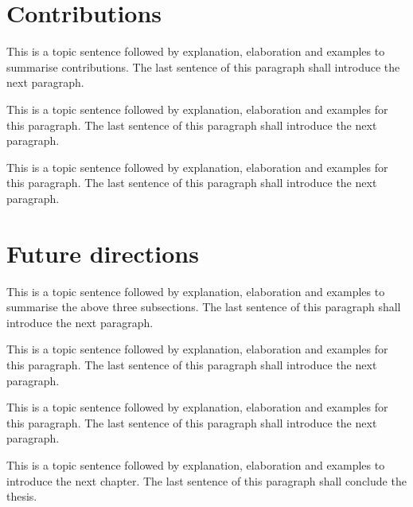 \section{Contributions}
\label{sec:ch_6_fourthmain}

This is a topic sentence followed by explanation, elaboration and examples to summarise contributions. The last sentence of this paragraph shall introduce the next paragraph. \lipsum[1]

This is a topic sentence followed by explanation, elaboration and examples for this paragraph. The last sentence of this paragraph shall introduce the next paragraph. \lipsum[1]

This is a topic sentence followed by explanation, elaboration and examples for this paragraph. The last sentence of this paragraph shall introduce the next paragraph. \lipsum[1]

\section{Future directions}
\label{sec:ch_6_forward}

This is a topic sentence followed by explanation, elaboration and examples to summarise the above three subsections. The last sentence of this paragraph shall introduce the next paragraph. \lipsum[1]

This is a topic sentence followed by explanation, elaboration and examples for this paragraph. The last sentence of this paragraph shall introduce the next paragraph. \lipsum[1]

This is a topic sentence followed by explanation, elaboration and examples for this paragraph. The last sentence of this paragraph shall introduce the next paragraph. \lipsum[1]

This is a topic sentence followed by explanation, elaboration and examples to introduce the next chapter. The last sentence of this paragraph shall conclude the thesis. \lipsum[1]







